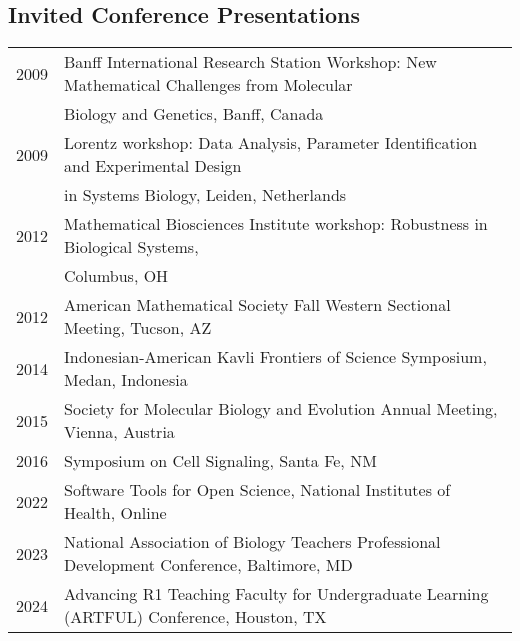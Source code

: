 \documentclass[11pt]{article}
\begin{document}
\subsection*{Invited Conference Presentations}
\begin{longtable}[l]{l l}
2009 & Banff International Research Station Workshop: New Mathematical Challenges from Molecular\\
&Biology and Genetics, Banff, Canada\\
2009 & Lorentz workshop: Data Analysis, Parameter Identification and Experimental Design\\
&in Systems Biology, Leiden, Netherlands\\
2012 & Mathematical Biosciences Institute workshop: Robustness in Biological Systems,\\
&Columbus, OH\\
2012 & American Mathematical Society Fall Western Sectional Meeting, Tucson, AZ\\
2014 & Indonesian-American Kavli Frontiers of Science Symposium, Medan, Indonesia\\
2015 & Society for Molecular Biology and Evolution Annual Meeting, Vienna, Austria\\
2016 & Symposium on Cell Signaling, Santa Fe, NM\\
2022 & Software Tools for Open Science, National Institutes of Health, Online\\
2023 & National Association of Biology Teachers Professional Development Conference, Baltimore, MD\\
2024 & Advancing R1 Teaching Faculty for Undergraduate Learning (ARTFUL) Conference, Houston, TX\\
\end{longtable}


\end{document}
